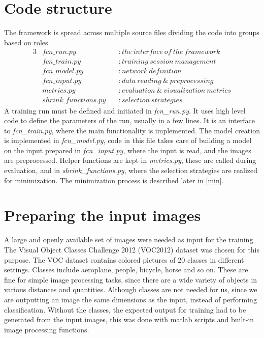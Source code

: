 \documentclass[12pt]{report}
\begin{document}
\section{Code structure}
The framework is spread across multiple source files dividing the code into groups based on roles.
\begin{alignat*}{3}
	&fcn\_run.py\          &&: the\ interface\ of\ the\ framework \\
	&fcn\_train.py\        &&: training\ session\ management \\
	&fcn\_model.py\        &&: network\ definition \\
	&fcn\_input.py\        &&: data\ reading\ \& \ preprocessing \\
	&metrics.py\           &&: evaluation\ \&\ visualization\ metrics \\
	&shrink\_functions.py\ &&: selection\ strategies
\end{alignat*}
A training run must be defined and initiated in \textit{fcn\_run.py}. It uses high level code to define the parameters of the run, usually in a few lines. It is an interface to \textit{fcn\_train.py}, where the main functionality is implemented. The model creation is implemented in \textit{fcn\_model.py}, code in this file takes care of building a model on the input prepared in \textit{fcn\_input.py}, where the input is read, and the images are preprocessed. Helper functions are kept in \textit{metrics.py}, these are called during evaluation, and in \textit{shrink\_functions.py}, where the selection strategies are realized for minimization. The minimization process is described later in \ref{min}.
\section{Preparing the input images}
A large and openly available set of images were needed as input for the training. The Visual Object Classes Challenge 2012 (VOC2012) dataset \cite{pascal-voc-2012} was chosen for this purpose. The VOC dataset contains colored pictures of 20 classes in different settings. Classes include aeroplane, people, bicycle, horse and so on. These are fine for simple image processing tasks, since there are a wide variety of objects in various distances and quantities. Although classes are not needed for us, since we are outputting an image the same dimensions as the input, instead of performing classification. Without the classes, the expected output for training had to be generated from the input images, this was done with matlab scripts and built-in image processing functions.
\end{document}
